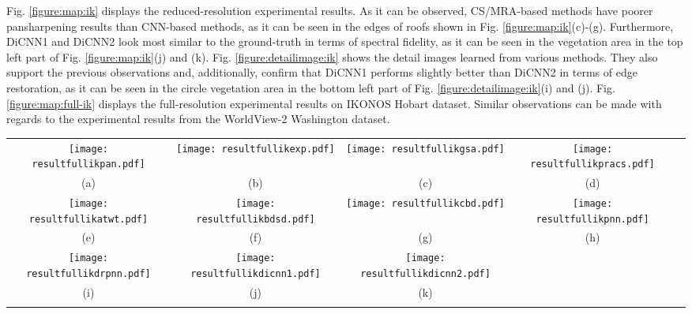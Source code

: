\documentclass[journal]{IEEEtran}
\begin{document}
Fig. \ref{figure:map:ik} displays the reduced-resolution experimental results. As it can be observed, CS/MRA-based methods have poorer pansharpening results than CNN-based methods, as it can be seen in the edges of roofs shown in Fig. \ref{figure:map:ik}(c)-(g). Furthermore, DiCNN1 and DiCNN2 look most similar to the ground-truth in terms of spectral fidelity, as it can be seen in the vegetation area in the top left part of Fig. \ref{figure:map:ik}(j) and (k). Fig. \ref{figure:detailimage:ik} shows the detail images learned from various methods. They also support the previous observations and, additionally, confirm that DiCNN1 performs slightly better than DiCNN2 in terms of edge restoration, as it can be seen in the circle vegetation area in the bottom left part of Fig. \ref{figure:detailimage:ik}(i) and (j). Fig. \ref{figure:map:full-ik} displays the full-resolution experimental results on IKONOS Hobart dataset. Similar observations can be made with regards to the experimental results from the WorldView-2 Washington dataset.

\begin{figure*}[t]\scriptsize
\centering
  \begin{tabular}{ccccc}
\texttt{[image: resultfullikpan.pdf]} &
\texttt{[image: resultfullikexp.pdf]} &
\texttt{[image: resultfullikgsa.pdf]} &
\texttt{[image: resultfullikpracs.pdf]} \\
(a) & (b) & (c) & (d) \\
\texttt{[image: resultfullikatwt.pdf]}&
\texttt{[image: resultfullikbdsd.pdf]}&
\texttt{[image: resultfullikcbd.pdf]}&
\texttt{[image: resultfullikpnn.pdf]} \\
(e) &(f) &(g) &(h) \\
\texttt{[image: resultfullikdrpnn.pdf]} &
\texttt{[image: resultfullikdicnn1.pdf]} &
\texttt{[image: resultfullikdicnn2.pdf]} \\
(i) &(j) & (k)  \\
\\
\end{tabular}
\caption{Full-resolution pansharpening results for IKONOS dataset: (a)PAN image; (b)EXP; (c)GSA; (d)PRACS; (e)ATWT; (f)BDSD; (g)GLP-CBD; (h)PNN; (i)DRPNN; (j)DiCNN1; (k)DiCNN2.}
\label{figure:map:full-ik}
\end{figure*}
\end{document}

